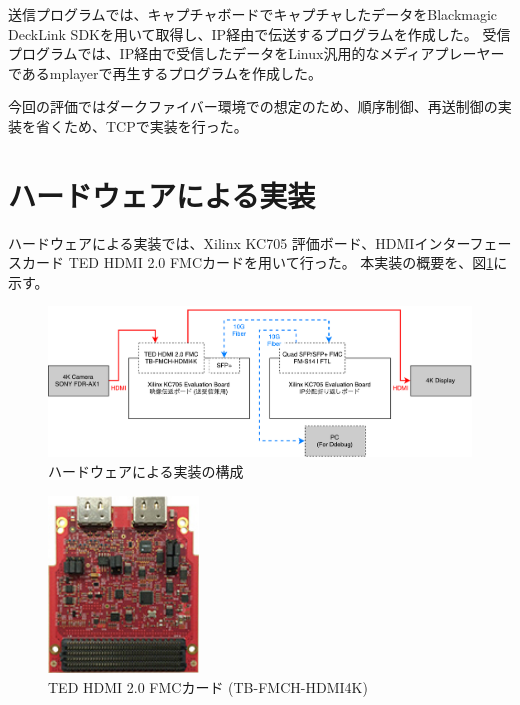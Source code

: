 送信プログラムでは、キャプチャボードでキャプチャしたデータをBlackmagic DeckLink SDK\cite{bmd-decklink-sdk}を用いて取得し、IP経由で伝送するプログラムを作成した。
受信プログラムでは、IP経由で受信したデータをLinux汎用的なメディアプレーヤーであるmplayerで再生するプログラムを作成した。

今回の評価ではダークファイバー環境での想定のため、順序制御、再送制御の実装を省くため、TCPで実装を行った。

\section{ハードウェアによる実装}

ハードウェアによる実装では、Xilinx KC705 評価ボード、HDMIインターフェースカード TED HDMI 2.0 FMCカードを用いて行った。
本実装の概要を、図\ref{fig:fpga-implement-flow}に示す。

\begin{figure}[htbp]
    \begin{center}
        \includegraphics[bb=0 0 841 299,width=15.5cm]{img/fpga-implement-flow.pdf}
    \end{center}
    \caption{ハードウェアによる実装の構成}
    \label{fig:fpga-implement-flow}
\end{figure}

\begin{figure}[htbp]
    \begin{center}
        \includegraphics[bb=0 0 137 161,width=4cm]{img/ted-4k-fmc-card.jpg}
    \end{center}
    \caption{TED HDMI 2.0 FMCカード (TB-FMCH-HDMI4K)}
    \label{fig:ted-4k-fmc-card}
\end{figure}

